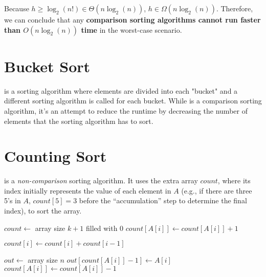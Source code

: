 \documentclass{report}
\begin{document}
Because $h \geq \log_{2}(n!) \in \Theta(n \log_{2}(n))$, $h \in \Omega(n \log_{2}(n))$. Therefore, we can conclude that any \textbf{comparison sorting algorithms cannot run faster than $O(n \log_{2}(n))$ time} in the worst-case scenario.

\section{Bucket Sort}

 is a sorting algorithm where elements are divided into each "bucket" and a different sorting algorithm is called for each bucket. While  is a comparison sorting algorithm, it's an attempt to reduce the runtime by decreasing the number of elements that the sorting algorithm has to sort.

\section{Counting Sort}

 is a \textit{non-comparison} sorting algorithm. It uses the extra array $count$, where its index initially represents the value of each element in $A$ (e.g., if there are three 5's in $A$, $count[5] = 3$ before the ``accumulation'' step to determine the final index), to sort the array.

\noindent \hrulefill

\begin{algorithmic}[1]
   
    \State $count \gets$ array size $k + 1$ filled with 0
     
      \State $count[A[i]] \gets count[A[i]] + 1$
    \EndFor
    \item[]
     
      \State $count[i] \gets count[i] + count[i - 1]$
    \EndFor
    \item[]
    \State $out \gets$ array size $n$
     
      \State $out[count[A[i]] - 1] \gets A[i]$
      \State $count[A[i]] \gets count[A[i]] - 1$
    \EndFor
    \item[]
    \State {}
  \EndFunction
\end{algorithmic}
\noindent \hrulefill
\end{document}
